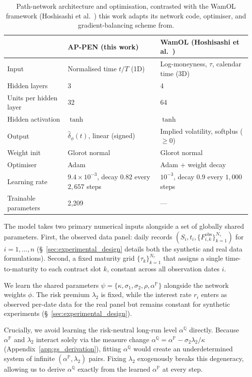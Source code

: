 \documentclass[11pt, a4paper]{article}
\begin{document}
\begin{table}[htbp]
\centering
\footnotesize
\caption{Path-network architecture and optimisation, contrasted with the WamOL framework (Hoshisashi et al.~\cite{Hoshisashi2024Physics-InformedPDEs, Hoshisashi2024Whack-a-moleSurface}) this work adapts its network code, optimiser, and gradient-balancing scheme from.}
\label{tab:network_arch}
\begin{tabular}{lll}
\toprule
 & AP-PEN (this work) & WamOL (Hoshisashi et al.~\cite{Hoshisashi2024Whack-a-moleSurface}) \\
\midrule
Input & Normalised time $t/T$ (1D) & Log-moneyness, $\tau$, calendar time (3D) \\
Hidden layers & 3 & 4 \\
Units per hidden layer & 32 & 64 \\
Hidden activation & $\tanh$ & $\tanh$ \\
Output & $\hat{\delta}_\phi(t)$, linear (signed) & Implied volatility, softplus ($\geq 0$) \\
Weight init & Glorot normal & Glorot normal \\
Optimiser & Adam & Adam + weight decay \\
Learning rate & $9.4\times10^{-3}$, decay $0.82$ every $2{,}657$ steps & $10^{-3}$, decay $0.9$ every $1{,}000$ steps \\
Trainable parameters & 2{,}209 & --- \\
\bottomrule
\end{tabular}
\end{table}

The model takes two primary numerical inputs alongside a set of globally shared parameters. First, the observed data panel: daily records $(S_i, t_i, \{F^{\text{obs}}_{i,k}\}_{k=1}^{N_\tau})$ for $i = 1, \dots, n$ (\S~\ref{sec:experimental_design} details both the synthetic and real data formulations). Second, a fixed maturity grid $\{\tau_k\}_{k=1}^{N_\tau}$ that assigns a single time-to-maturity to each contract slot $k$, constant across all observation dates $i$.

We learn the shared parameters $\psi = \{\kappa, \sigma_1, \sigma_2, \rho, \alpha^{\mathbb{P}}\}$ alongside the network weights $\phi$. The risk premium $\lambda_2$ is fixed, while the interest rate $r_i$ enters as observed per-date data for the real panel but remains constant for synthetic experiments (\S~\ref{sec:experimental_design}). 

Crucially, we avoid learning the risk-neutral long-run level $\alpha^{\mathbb{Q}}$ directly. Because $\alpha^{\mathbb{P}}$ and $\lambda_2$ interact solely via the measure change $\alpha^{\mathbb{Q}} = \alpha^{\mathbb{P}} - \sigma_2\lambda_2/\kappa$ (Appendix~\ref{app:gs_derivation}), fitting $\alpha^{\mathbb{Q}}$ would create an underdetermined system of infinite $(\alpha^{\mathbb{P}}, \lambda_2)$ pairs. Fixing $\lambda_2$ exogenously breaks this degeneracy, allowing us to derive $\alpha^{\mathbb{Q}}$ exactly from the learned $\alpha^{\mathbb{P}}$ at every step.
\end{document}
